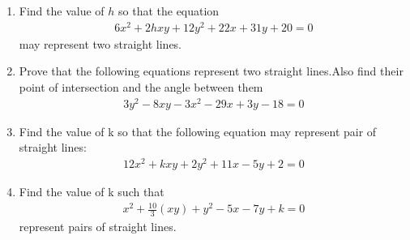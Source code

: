 \renewcommand{\theequation}{\theenumi}
\renewcommand{\thefigure}{\theenumi}
\begin{enumerate}[label=\thesection.\arabic*.,ref=\thesection.\theenumi]
%
\item 
Find the value of $h$ so that the equation 
\begin{align}
6x^2+2hxy+12y^2+22x+31y+20=0
\label{eq:solutions/13/ex2/question}
\end{align}
 may represent two straight lines.
\\
\solution

\item Prove that the following equations represent two straight lines.Also find their point of intersection and the angle between them
\begin{align}
 3y^2-8xy-3x^2-29x+3y-18=0   
\label{eq:solutions/13/3/1}
\end{align}
\solution

\item Find the value of k so that the following equation may represent pair of straight lines: 
\begin{align}
    12x^2+kxy+2y^2+11x-5y+2=0\label{eq:solutions/13/8/1.1}
\end{align}
\solution

\item Find the value of k such that 
\begin{align}
x^{2}+ \frac{10}{3}(xy)+y^2 -5x -7y + k =0 \label{eq:solutions/13/11eq5}
\end{align}
 represent pairs of straight lines.
\solution

\end{enumerate}


